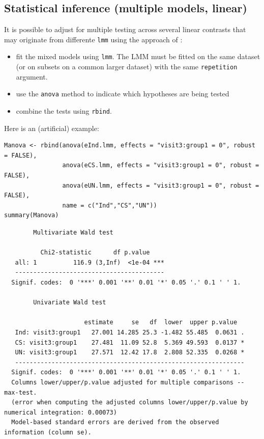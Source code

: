\documentclass[12pt]{article}
\begin{document}
\clearpage

\subsection{Statistical inference (multiple models, linear)}
\label{sec:org51f00e1}

It is possible to adjust for multiple testing across several linear
contrasts that may originate from differente \texttt{lmm} using the approach
of \cite{pipper2012versatile}:
\begin{itemize}
\item fit the mixed models using \texttt{lmm}. The LMM must be fitted on the same
dataset (or on subsets on a common larger dataset) with the same \texttt{repetition} argument.
\item use the \texttt{anova} method to indicate which hypotheses are being tested
\item combine the tests using \texttt{rbind}.
\end{itemize}

Here is an (artificial) example:
\lstset{language=r,label= ,caption= ,captionpos=b,numbers=none}
\begin{lstlisting}
Manova <- rbind(anova(eInd.lmm, effects = "visit3:group1 = 0", robust = FALSE),
                anova(eCS.lmm, effects = "visit3:group1 = 0", robust = FALSE),
                anova(eUN.lmm, effects = "visit3:group1 = 0", robust = FALSE),
                name = c("Ind","CS","UN"))
summary(Manova) 
\end{lstlisting}

\begin{verbatim}
		Multivariate Wald test 

          Chi2-statistic      df p.value    
   all: 1          116.9 (3,Inf)  <1e-04 ***
   ----------------------------------------- 
  Signif. codes:  0 '***' 0.001 '**' 0.01 '*' 0.05 '.' 0.1 ' ' 1.

		Univariate Wald test 

                      estimate     se   df  lower  upper p.value  
   Ind: visit3:group1   27.001 14.285 25.3 -1.482 55.485  0.0631 .
   CS: visit3:group1    27.481  11.09 52.8  5.369 49.593  0.0137 *
   UN: visit3:group1    27.571  12.42 17.8  2.808 52.335  0.0268 *
   --------------------------------------------------------------- 
  Signif. codes:  0 '***' 0.001 '**' 0.01 '*' 0.05 '.' 0.1 ' ' 1.
  Columns lower/upper/p.value adjusted for multiple comparisons -- max-test.
  (error when computing the adjusted columns lower/upper/p.value by numerical integration: 0.00073)
  Model-based standard errors are derived from the observed information (column se).
\end{verbatim}
\end{document}
